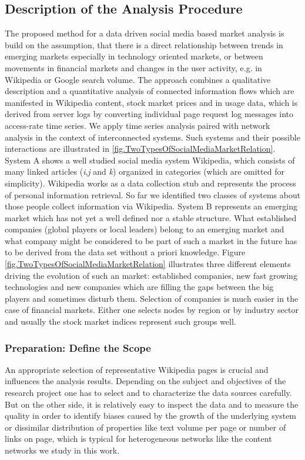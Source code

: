 \documentclass[a4paper,10pt]{scrbook}
\begin{document}
\subsection{Description of the Analysis Procedure}
\label{sec.STEPS.MS}
The proposed method for a data driven social media based market analysis is build on the assumption, that there is a direct relationship between trends in emerging markets especially in technology oriented markets, or between movements in financial markets and changes in the user activity, e.g. in Wikipedia or Google search volume. The approach combines a qualitative description and a quantitative analysis of connected information flows which are manifested in Wikipedia content, stock market prices and in usage data, which is derived from server logs by converting individual page request log messages into access-rate time series. We apply time series analysis paired with network analysis in the context of interconnected systems. Such systems and their possible interactions are illustrated in \ref{fig.TwoTypesOfSocialMediaMarketRelation}. System A shows a well studied social media system Wikipedia, which consists of many linked articles (\textit{i},\textit{j} and \textit{k}) organized in categories (which are omitted for simplicity). Wikipedia works as a data collection stub and represents the process of personal information retrieval. So far we identified two classes of systems about those people collect information via Wikipedia. System B represents an emerging market which has not yet a well defined nor a stable structure. What established companies (global players or local leaders) belong to an emerging market and what company might be considered to be part of such a market in the future has to be derived from the data set without a priori knowledge. Figure \ref{fig.TwoTypesOfSocialMediaMarketRelation} illustrates three different elements driving the evolution of such an market: established companies, new fast growing technologies and new companies which are filling the gaps between the big players and sometimes disturb them. Selection of companies is much easier in the case of financial markets. Either one selects nodes by region or by industry sector and usually the stock market indices represent such groups well.\\

\subsubsection*{Preparation: Define the Scope}
An appropriate selection of representative Wikipedia pages is crucial and influences the analysis results. Depending on the subject and objectives of the research project one has to select and to characterize the data sources carefully. But on the other side, it is relatively easy to inspect the data and to measure the quality in order to identify biases caused by the growth of the underlying system or dissimilar distribution of properties like text volume per page or number of links on page, which is typical for heterogeneous networks like the content networks we study in this work.
\end{document}

